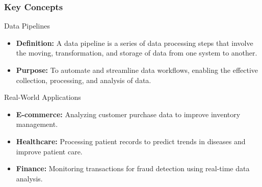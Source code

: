 \documentclass{beamer}
\begin{document}
\begin{frame}[fragile]
    \frametitle{Key Concepts}
    \begin{block}{Data Pipelines}
        \begin{itemize}
            \item \textbf{Definition:} A data pipeline is a series of data processing steps that involve the moving, transformation, and storage of data from one system to another.
            \item \textbf{Purpose:} To automate and streamline data workflows, enabling the effective collection, processing, and analysis of data.
        \end{itemize}
    \end{block}
    
    \begin{block}{Real-World Applications}
        \begin{itemize}
            \item \textbf{E-commerce:} Analyzing customer purchase data to improve inventory management.
            \item \textbf{Healthcare:} Processing patient records to predict trends in diseases and improve patient care.
            \item \textbf{Finance:} Monitoring transactions for fraud detection using real-time data analysis.
        \end{itemize}
    \end{block}
\end{frame}
\end{document}
